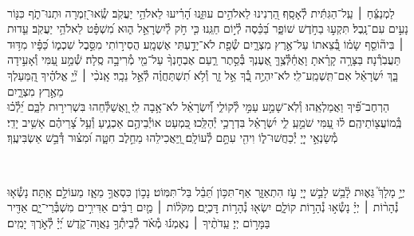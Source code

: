 \documentclass[twoside, openany, parskip=half, 11pt]{book}
\begin{document}
{\\
\vspace{-1.5\baselineskip}
\begin{narrow}
%
לַמְנַצֵּ֬חַ ׀ עַֽל־הַגִּתִּ֬ית לְ֯אָסָֽף׃
הַ֭רְנִינוּ לֵאלֹהִ֣ים עוּזֵּ֑נוּ הָ֝רִ֗יעוּ לֵאלֹהֵ֥י יַעֲקֹֽב׃
שְֽׂ֯אוּ־זִ֭מְרָה וּתְנוּ־תֹ֑ף כִּנּ֖וֹר נָעִ֣ים עִם־נָֽבֶל׃
תִּקְע֣וּ בַחֹ֣דֶשׁ שׁוֹפָ֑ר בַּ֝כֵּ֗סֶה לְ֯י֣וֹם חַגֵּֽנוּ׃
כִּ֤י חֹ֣ק לְ֯יִשְׂרָאֵ֣ל ה֑וּא מִ֝שְׁפָּ֗ט לֵאלֹהֵ֥י יַעֲקֹֽב׃
עֵ֤דוּת ׀ בִּיה֘וֹסֵ֤ף שָׂמ֗וֹ בְּ֭֯צֵאתוֹ עַל־אֶ֣רֶץ מִצְרָ֑יִם שְׂ֯פַ֖ת לֹא־יָדַ֣עְתִּי אֶשְׁמָֽע׃
הֲסִיר֣וֹתִי מִסֵּ֣בֶל שִׁכְמ֑וֹ כַּ֝פָּ֗יו מִדּ֥וּד תַּעֲבֹֽרְ֯נָה׃
בַּצָּרָ֥ה קָרָ֗אתָ וָאֲחַ֫לְּ֯צֶ֥ךָּ אֶ֭עֶנְךָ בְּ֯סֵ֣תֶר רַ֑עַם אֶבְחׇנְךָ֨ עַל־מֵ֖י מְ֯רִיבָ֣ה סֶֽלָה׃
שְׁ֯מַ֣ע עַ֭מִּי וְ֯אָעִ֣ידָה בָּ֑ךְ יִ֝שְׂרָאֵ֗ל אִם־תִּֽשְׁמַֽע־לִֽי׃
לֹא־יִהְיֶ֣ה בְ֭֯ךָ אֵ֣ל זָ֑ר וְ֯לֹ֥א תִ֝שְׁתַּחֲוֶ֗ה לְ֯אֵ֣ל נֵכָֽר׃
אָֽנֹכִ֨י ׀ יְ֘יָ֤ אֱלֹהֶ֗יךָ הַֽ֭מַּעַלְךָ מֵאֶ֣רֶץ מִצְרָ֑יִם \\ הַרְחֶב־פִּ֗֝יךָ וַאֲמַלְאֵֽהוּ׃
וְ֯לֹֽא־שָׁמַ֣ע עַמִּ֣י לְ֯קוֹלִ֑י וְ֯֝יִשְׂרָאֵ֗ל לֹא־אָ֥בָה לִֽי׃
וָ֭אֲשַׁלְּ֯חֵהוּ בִּשְׁרִיר֣וּת לִבָּ֑ם יֵ֝לְ֯כ֗וּ בְּֽ֯מוֹעֲצ֖וֹתֵיהֶֽם׃
ל֗וּ עַ֭מִּי שֹׁמֵ֣עַֽ לִ֑י יִ֝שְׂרָאֵ֗ל בִּדְרָכַ֥י יְ֯הַלֵּֽכוּ׃
כִּ֭מְעַט אוֹיְ֯בֵיהֶ֣ם אַכְנִ֑יעַ וְ֯עַ֥ל צָ֝רֵיהֶ֗ם אָשִׁ֥יב יָדִֽי׃
מְ֯שַׂנְאֵ֣י יְיָ֭ יְ֯כַחֲשׁוּ־ל֑וֹ וִיהִ֖י עִתָּ֣ם לְ֯עוֹלָֽם׃
וַֽ֭יַּאֲכִילֵהוּ מֵחֵ֣לֶב חִטָּ֑ה וּ֝מִצּ֗וּר דְּ֯בַ֣שׁ אַשְׂבִּיעֶֽךָ׃
\end{narrow}

\\
\vspace{-1.5\baselineskip}
\begin{narrow}
יְיָ֣ מָלָךְ֮ גֵּא֢וּת לָ֫בֵ֥שׁ
לָבֵ֣שׁ יְיָ֭ עֹ֣ז הִתְאַזָּ֑ר אַף־תִּכּ֥וֹן תֵּ֝בֵ֗ל בַּל־תִּמּֽוֹט׃
נָכ֣וֹן כִּסְאֲךָ֣ מֵאָ֑ז מֵעוֹלָ֣ם אָֽתָּה׃
נָשְׂ֯א֤וּ נְ֯הָר֨וֹת ׀ יְיָ֗ נָשְׂ֯א֣וּ נְ֯הָר֣וֹת קוֹלָ֑ם יִשְׂא֖וּ נְ֯הָר֣וֹת דׇּכְיָֽם׃
מִקֹּל֨וֹת ׀ מַ֤יִם רַבִּ֗ים אַדִּירִ֣ים מִשְׁבְּ֯רֵי־יָ֑ם אַדִּ֖יר בַּמָּר֣וֹם יְיָ׃
עֵֽדֹתֶ֨יךָ ׀ נֶאֶמְנ֬וּ מְ֯אֹ֗ד לְ֯בֵיתְ֯ךָ֥ נַאֲוָה־קֹ֑דֶשׁ יְ֝יָ֗ לְ֯אֹ֣רֶךְ יָמִֽים׃
\end{narrow}
}

\weekdayshir
\end{document}
